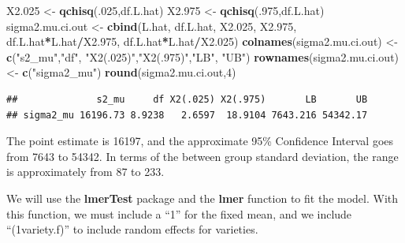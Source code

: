 \documentclass[
]{book}
\newenvironment{Shaded}{\begin{snugshade}}{\end{snugshade}}
\newcommand{\AttributeTok}[1]{\textcolor[rgb]{0.13,0.29,0.53}{#1}}
\newcommand{\DecValTok}[1]{\textcolor[rgb]{0.00,0.00,0.81}{#1}}
\newcommand{\FloatTok}[1]{\textcolor[rgb]{0.00,0.00,0.81}{#1}}
\newcommand{\FunctionTok}[1]{\textcolor[rgb]{0.13,0.29,0.53}{\textbf{#1}}}
\newcommand{\NormalTok}[1]{#1}
\newcommand{\OtherTok}[1]{\textcolor[rgb]{0.56,0.35,0.01}{#1}}
\newcommand{\SpecialCharTok}[1]{\textcolor[rgb]{0.81,0.36,0.00}{\textbf{#1}}}
\newcommand{\StringTok}[1]{\textcolor[rgb]{0.31,0.60,0.02}{#1}}
\begin{document}
\begin{Shaded}
\begin{Highlighting}[]
\NormalTok{X2}\FloatTok{.025} \OtherTok{\textless{}{-}} \FunctionTok{qchisq}\NormalTok{(.}\DecValTok{025}\NormalTok{,df.L.hat)}
\NormalTok{X2}\FloatTok{.975} \OtherTok{\textless{}{-}} \FunctionTok{qchisq}\NormalTok{(.}\DecValTok{975}\NormalTok{,df.L.hat)}
\NormalTok{sigma2.mu.ci.out }\OtherTok{\textless{}{-}} \FunctionTok{cbind}\NormalTok{(L.hat, df.L.hat, X2}\FloatTok{.025}\NormalTok{, X2}\FloatTok{.975}\NormalTok{, }
\NormalTok{                           df.L.hat}\SpecialCharTok{*}\NormalTok{L.hat}\SpecialCharTok{/}\NormalTok{X2}\FloatTok{.975}\NormalTok{, df.L.hat}\SpecialCharTok{*}\NormalTok{L.hat}\SpecialCharTok{/}\NormalTok{X2}\FloatTok{.025}\NormalTok{)}
\FunctionTok{colnames}\NormalTok{(sigma2.mu.ci.out) }\OtherTok{\textless{}{-}} \FunctionTok{c}\NormalTok{(}\StringTok{"s2\_mu"}\NormalTok{,}\StringTok{"df"}\NormalTok{, }\StringTok{"X2(.025)"}\NormalTok{,}\StringTok{"X2(.975)"}\NormalTok{,}\StringTok{"LB"}\NormalTok{, }\StringTok{"UB"}\NormalTok{)}
\FunctionTok{rownames}\NormalTok{(sigma2.mu.ci.out) }\OtherTok{\textless{}{-}} \FunctionTok{c}\NormalTok{(}\StringTok{"sigma2\_mu"}\NormalTok{)}
\FunctionTok{round}\NormalTok{(sigma2.mu.ci.out,}\DecValTok{4}\NormalTok{)}
\end{Highlighting}
\end{Shaded}

\begin{verbatim}
##              s2_mu     df X2(.025) X2(.975)       LB       UB
## sigma2_mu 16196.73 8.9238   2.6597  18.9104 7643.216 54342.17
\end{verbatim}

The point estimate is 16197, and the approximate 95\% Confidence
Interval goes from 7643 to 54342. In terms of the between group standard
deviation, the range is approximately from 87 to 233.

We will use the \textbf{lmerTest} package and the \textbf{lmer} function
to fit the model. With this function, we must include a ``1'' for the
fixed mean, and we include ``(1\textbar variety.f)'' to include random
effects for varieties.

\begin{Shaded}
\end{Shaded}
\end{document}
